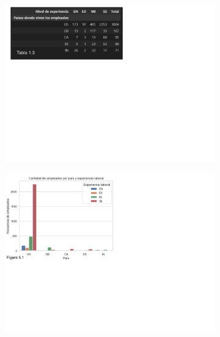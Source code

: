\documentclass{article}
\begin{document}
	\begin{figure}[htbp]
		\begin{subfigure}[b]{1.1\textwidth}
			\includegraphics[width=\textwidth]{FigurasTablas/tabla1.3.png}
			\label{tabla 1.3}
		\end{subfigure}
		\begin{subfigure}[b]{1.1\textwidth}
			\includegraphics[width=20cm]{FigurasTablas/figura5.1graficabarras.png}
			\label{figura 5.1 grafico de barras agrupado}
		\end{subfigure}
	\end{figure}
\end{document}

